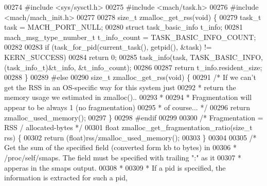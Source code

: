 \begin{DoxyCode}
{{00274 \textcolor{preprocessor}{#}\textcolor{preprocessor}{include} \textcolor{preprocessor}{<}\textcolor{preprocessor}{sys}\textcolor{preprocessor}{/}\textcolor{preprocessor}{sysctl}\textcolor{preprocessor}{.}\textcolor{preprocessor}{h}\textcolor{preprocessor}{>}
00275 \textcolor{preprocessor}{#}\textcolor{preprocessor}{include} \textcolor{preprocessor}{<}\textcolor{preprocessor}{mach}\textcolor{preprocessor}{/}\textcolor{preprocessor}{task}\textcolor{preprocessor}{.}\textcolor{preprocessor}{h}\textcolor{preprocessor}{>}
00276 \textcolor{preprocessor}{#}\textcolor{preprocessor}{include} \textcolor{preprocessor}{<}\textcolor{preprocessor}{mach}\textcolor{preprocessor}{/}\textcolor{preprocessor}{mach\_init}\textcolor{preprocessor}{.}\textcolor{preprocessor}{h}\textcolor{preprocessor}{>}
00277 
00278 size\_t zmalloc\_get\_rss(\textcolor{keywordtype}{void}) \{
00279     task\_t task = MACH\_PORT\_NULL;
00280     \textcolor{keyword}{struct} task\_basic\_info t\_info;
00281     mach\_msg\_type\_number\_t t\_info\_count = TASK\_BASIC\_INFO\_COUNT;
00282 
00283     \textcolor{keywordflow}{if} (task\_for\_pid(current\_task(), getpid(), &task) != KERN\_SUCCESS)
00284         \textcolor{keywordflow}{return} 0;
00285     task\_info(task, TASK\_BASIC\_INFO, (task\_info\_t)&t\_info, &t\_info\_count);
00286 
00287     \textcolor{keywordflow}{return} t\_info.resident\_size;
00288 \}
00289 \textcolor{preprocessor}{#}\textcolor{preprocessor}{else}
00290 size\_t zmalloc\_get\_rss(\textcolor{keywordtype}{void}) \{
00291     \textcolor{comment}{/* If we can't get the RSS in an OS-specific way for this system just}
00292 \textcolor{comment}{     * return the memory usage we estimated in zmalloc()..}
00293 \textcolor{comment}{     *}
00294 \textcolor{comment}{     * Fragmentation will appear to be always 1 (no fragmentation)}
00295 \textcolor{comment}{     * of course... */}
00296     \textcolor{keywordflow}{return} zmalloc\_used\_memory();
00297 \}
00298 \textcolor{preprocessor}{#}\textcolor{preprocessor}{endif}
00299 
00300 \textcolor{comment}{/* Fragmentation = RSS / allocated-bytes */}
00301 \textcolor{keywordtype}{float} zmalloc\_get\_fragmentation\_ratio(size\_t rss) \{
00302     \textcolor{keywordflow}{return} (\textcolor{keywordtype}{float})rss/zmalloc\_used\_memory();
00303 \}
00304 
00305 \textcolor{comment}{/* Get the sum of the specified field (converted form kb to bytes) in}
00306 \textcolor{comment}{ * /proc/self/smaps. The field must be specified with trailing ":" as it}
00307 \textcolor{comment}{ * apperas in the smaps output.}
00308 \textcolor{comment}{ *}
00309 \textcolor{comment}{ * If a pid is specified, the information is extracted for such a pid,}
}}
\end{DoxyCode}

